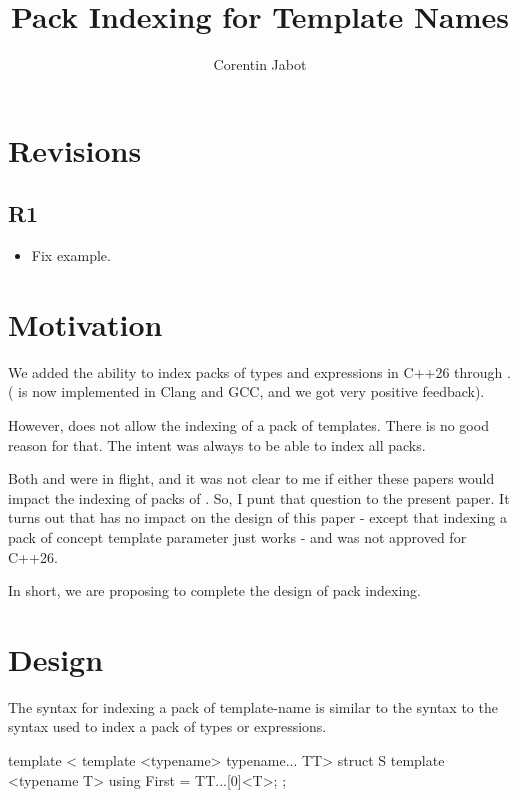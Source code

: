 \documentclass{wg21}
\title{Pack Indexing for Template Names}
\author{Corentin Jabot}{corentin.jabot@gmail.com}
\begin{document}
\maketitle

\section{Revisions}

\subsection{R1}

\begin{itemize}
\item Fix example.
\end{itemize}

\section{Motivation}

We added the ability to index packs of types and expressions in C++26 through .
( is now implemented in Clang and GCC, and we got very positive feedback).

However,  does not allow the indexing of a pack of templates.
There is no good reason for that. The intent was always to be able to index all packs.

Both  and  were in flight, and it was not clear to me if either
these papers would impact the indexing of packs of .
So, I punt that question to the present paper.
It turns out that  has no impact on the design of this paper - except that indexing a pack of
concept template parameter just works - and  was not approved for C++26.

In short, we are proposing to complete the design of pack indexing.

\section{Design}

The syntax for indexing a pack of template-name is similar to the syntax
to the syntax used to index a pack of types or expressions.

\begin{colorblock}

template < template <typename> typename... TT>
struct S {
    template <typename T>
    using First = TT...[0]<T>;
};
\end{colorblock}
\end{document}
